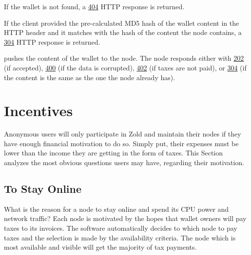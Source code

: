 \documentclass{main}
\begin{document}
If the wallet is not found, a
\href{https://www.w3.org/Protocols/rfc2616/rfc2616-sec10.html#sec10.4.5}{404}
HTTP response is returned.

If the client provided the pre-calculated MD5 hash of the wallet content in the
\href{https://www.w3.org/Protocols/rfc2616/rfc2616-sec14.html#sec14.26}{}
HTTP header and it matches with the hash of the
content the node contains, a
\href{https://www.w3.org/Protocols/rfc2616/rfc2616-sec10.html#sec10.3.5}{304} HTTP response is returned.

 pushes the content of the wallet to the node. The
node responds either with
\href{https://www.w3.org/Protocols/rfc2616/rfc2616-sec10.html#sec10.2.3}{202} (if accepted),
\href{https://www.w3.org/Protocols/rfc2616/rfc2616-sec10.html#sec10.4.1}{400} (if the data is corrupted),
\href{https://www.w3.org/Protocols/rfc2616/rfc2616-sec10.html#sec10.4.3}{402} (if taxes are not paid),
or
\href{https://www.w3.org/Protocols/rfc2616/rfc2616-sec10.html#sec10.3.5}{304}
(if the content is the same as the one the node already has).

\section{Incentives}\label{sec:incentives}

Anonymous users will only participate in Zold and maintain
their nodes if they have enough financial motivation to do so. Simply
put, their expenses must be lower than the income they are getting in
the form of taxes. This Section analyzes the most obvious questions users
may have, regarding their motivation.

\subsection{To Stay Online}

What is the reason for a node to stay online and spend its CPU power
and network traffic? Each node is motivated by the
hopes that wallet owners will pay taxes to its invoices. The software
automatically decides to which node to pay taxes and the selection is
made by the availability criteria. The node which is most available
and visible will get the majority of tax payments.
\end{document}
